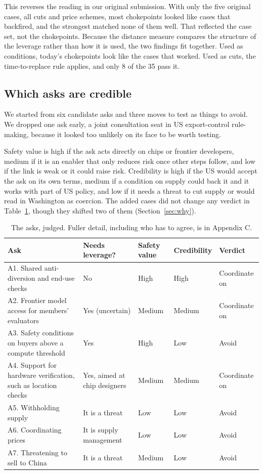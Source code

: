 \documentclass[11pt]{article}
\begin{document}
This reverses the reading in our original submission. With only the five original cases, all cuts and price schemes, most chokepoints looked like cases that backfired, and the strongest matched none of them well. That reflected the case set, not the chokepoints. Because the distance measure compares the structure of the leverage rather than how it is used, the two findings fit together. Used as conditions, today's chokepoints look like the cases that worked. Used as cuts, the time-to-replace rule applies, and only 8 of the 35 pass it.

\subsection{Which asks are credible}

We started from six candidate asks and three moves to test as things to avoid. We dropped one ask early, a joint consultation seat in US export-control rule-making, because it looked too unlikely on its face to be worth testing.

Safety value is high if the ask acts directly on chips or frontier developers, medium if it is an enabler that only reduces risk once other steps follow, and low if the link is weak or it could raise risk. Credibility is high if the US would accept the ask on its own terms, medium if a condition on supply could back it and it works with part of US policy, and low if it needs a threat to cut supply or would read in Washington as coercion. The added cases did not change any verdict in Table~\ref{tab:asks}, though they shifted two of them (Section~\ref{sec:why}).

\begin{table}[htbp]
\centering\small
\begin{tabularx}{\linewidth}{@{}X >{\raggedright\arraybackslash}p{3.2cm} >{\raggedright\arraybackslash}p{2.0cm} l l@{}}
\toprule
\textbf{Ask} & \textbf{Needs leverage?} & \textbf{Safety value} & \textbf{Credibility} & \textbf{Verdict}\\
\midrule
A1. Shared anti-diversion and end-use checks & No & High & High & Coordinate on\\
A2. Frontier model access for members' evaluators & Yes (uncertain) & Medium & Medium & Coordinate on\\
A3. Safety conditions on buyers above a compute threshold & Yes & High & Low & Avoid\\
A4. Support for hardware verification, such as location checks & Yes, aimed at chip designers & Medium & Medium & Coordinate on\\
A5. Withholding supply & It is a threat & Low & Low & Avoid\\
A6. Coordinating prices & It is supply management & Low & Low & Avoid\\
A7. Threatening to sell to China & It is a threat & Medium & Low & Avoid\\
\bottomrule
\end{tabularx}
\caption{The asks, judged. Fuller detail, including who has to agree, is in Appendix C.}
\label{tab:asks}
\end{table}
\end{document}
